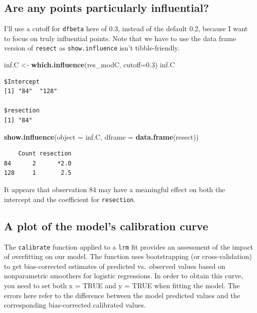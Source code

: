 \documentclass[]{book}
\newenvironment{Shaded}{\begin{snugshade}}{\end{snugshade}}
\newcommand{\KeywordTok}[1]{\textcolor[rgb]{0.13,0.29,0.53}{\textbf{#1}}}
\newcommand{\DataTypeTok}[1]{\textcolor[rgb]{0.13,0.29,0.53}{#1}}
\newcommand{\FloatTok}[1]{\textcolor[rgb]{0.00,0.00,0.81}{#1}}
\newcommand{\StringTok}[1]{\textcolor[rgb]{0.31,0.60,0.02}{#1}}
\newcommand{\NormalTok}[1]{#1}
\theoremstyle{definition}
\theoremstyle{definition}
\theoremstyle{definition}
\theoremstyle{remark}
\begin{document}
\subsection{Are any points particularly
influential?}\label{are-any-points-particularly-influential}

I'll use a cutoff for \texttt{dfbeta} here of 0.3, instead of the
default 0.2, because I want to focus on truly influential points. Note
that we have to use the data frame version of \texttt{resect} as
\texttt{show.influence} isn't tibble-friendly.

\begin{Shaded}
\begin{Highlighting}[]
\NormalTok{inf.C <-}\StringTok{ }\KeywordTok{which.influence}\NormalTok{(res_modC, }\DataTypeTok{cutoff=}\FloatTok{0.3}\NormalTok{)}
\NormalTok{inf.C}
\end{Highlighting}
\end{Shaded}

\begin{verbatim}
$Intercept
[1] "84"  "128"

$resection
[1] "84"
\end{verbatim}

\begin{Shaded}
\begin{Highlighting}[]
\KeywordTok{show.influence}\NormalTok{(}\DataTypeTok{object =}\NormalTok{ inf.C, }\DataTypeTok{dframe =} \KeywordTok{data.frame}\NormalTok{(resect))}
\end{Highlighting}
\end{Shaded}

\begin{verbatim}
    Count resection
84      2      *2.0
128     1       2.5
\end{verbatim}

It appears that observation 84 may have a meaningful effect on both the
intercept and the coefficient for \texttt{resection}.

\subsection{A plot of the model's calibration
curve}\label{a-plot-of-the-models-calibration-curve}

The \texttt{calibrate} function applied to a \texttt{lrm} fit provides
an assessment of the impact of overfitting on our model. The function
uses bootstrapping (or cross-validation) to get bias-corrected estimates
of predicted vs.~observed values based on nonparametric smoothers for
logistic regressions. In order to obtain this curve, you need to set
both x = TRUE and y = TRUE when fitting the model. The errors here refer
to the difference between the model predicted values and the
corresponding bias-corrected calibrated values.
\end{document}
